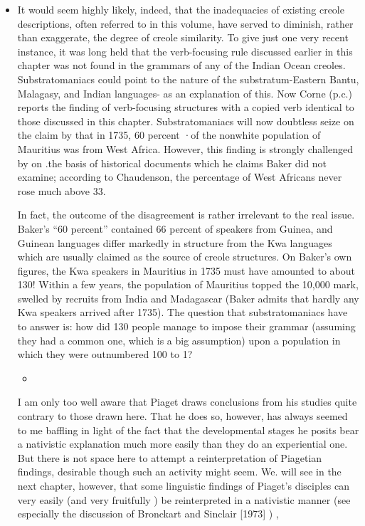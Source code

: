 \begin{itemize}
\begin{itemize}
\begin{itemize}
\begin{itemize}
\begin{itemize}
\begin{itemize}
\begin{itemize}
\item It would seem highly likely, indeed, that the inadequacies of existing creole descriptions, often referred to in this volume, have served to diminish, rather than exaggerate, the degree of creole simi\-larity. To give just one very recent instance, it was long held that the verb-focusing rule discussed earlier in this chapter was not found in the grammars of any of the Indian Ocean creoles. Substratomaniacs could point to the nature of the substratum-Eastern Bantu, Malagasy, and Indian languages- as an explanation of this. Now Corne (p.c.) reports the finding of verb-focusing structures with a copied verb identical to those discussed in this chapter. Substratomaniacs will now doubtless seize on the claim by \citet{Baker1976} that in 1735, 60 percent ·of the nonwhite population of Mauritius was from West Africa. However, this finding is strongly challenged by \citet{Chaudenson1979} on .the basis of historical documents which he claims Baker did not examine; according to Chaudenson, the percentage of West Africans never rose much above 33.

In fact, the outcome of the disagreement is rather irrelevant to the real issue. Baker's ``60 percent'' contained 66 percent of speakers from Guinea, and Guinean languages differ markedly in structure from the Kwa languages which are usually claimed as the source of creole structures. On Baker's own figures, the Kwa speakers in Mauritius in 1735 must have amounted to about 130! Within a few years, the population of Mauritius topped the 10,000 mark, swelled by recruits from India and Madagascar (Baker admits that hardly any Kwa speakers arrived after 1735). The question that substratomaniacs have to answer is: how did 130 people manage to impose their grammar (assuming they had a common one, which is a big assumption) upon a population in which they were outnumbered 100 to 1?

\begin{itemize}
\item 
\end{itemize}

I am only too well aware that Piaget draws conclusions from his studies quite contrary to those drawn here. That he does so, how\-ever, has always seemed to me baffling in light of the fact that the developmental stages he posits bear a nativistic explanation much more easily than they do an experiential one. But there is not space here to attempt a reinterpretation of Piagetian findings, desirable though such an activity might seem. We. will see in the next chapter, however, that some linguistic findings of Piaget's disciples can very easily (and very fruitfully ) be reinterpreted in a nativistic manner (see especially the discussion of Bronckart and Sinclair [1973] ) ,


\end{itemize}
\end{itemize}
\end{itemize}
\end{itemize}
\end{itemize}
\end{itemize}
\end{itemize}
